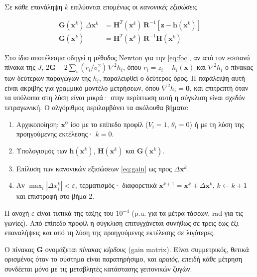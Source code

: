 Σε κάθε επανάληψη $k$ επιλύονται επομένως οι \emph{κανονικές εξισώσεις}

\begin{align}
\mathbf{G}(\mathbf{x}^{k}) \, \Delta \mathbf{x}^{k}
  &= \mathbf{H}^{T}(\mathbf{x}^{k}) \, \mathbf{R}^{-1}
     \left[\mathbf{z} - \mathbf{h}(\mathbf{x}^{k})\right] \\
\mathbf{G}(\mathbf{x}^{k})
  &= \mathbf{H}^{T}(\mathbf{x}^{k}) \, \mathbf{R}^{-1} \mathbf{H}(\mathbf{x}^{k})
\label{eq:gain}
\end{align}

Στο ίδιο αποτέλεσμα οδηγεί η μέθοδος Newton για την \eqref{eq:foc}, αν από τον εσσιανό πίνακα
της $J$, $2\mathbf{G} - 2\sum_{i} (r_i/\sigma_i^2)\,\nabla^{2} h_i$, όπου
$r_i = z_i - h_i(\mathbf{x})$ και $\nabla^{2} h_i$ ο πίνακας των δεύτερων παραγώγων της $h_i$,
παραλειφθεί ο δεύτερος όρος. Η
παράλειψη αυτή είναι ακριβής για γραμμικό μοντέλο μετρήσεων, όπου $\nabla^{2} h_i = \mathbf{0}$,
και επιτρεπτή όταν τα υπόλοιπα στη λύση είναι μικρά· στην περίπτωση αυτή η σύγκλιση είναι
σχεδόν τετραγωνική. Ο αλγόριθμος περιλαμβάνει τα ακόλουθα βήματα:

\begin{enumerate}
\item Αρχικοποίηση: $\mathbf{x}^{0}$ ίσο με το επίπεδο προφίλ ($V_i = 1$, $\theta_i = 0$) ή
      με τη λύση της προηγούμενης εκτέλεσης· $k = 0$.
\item Υπολογισμός των $\mathbf{h}(\mathbf{x}^{k})$, $\mathbf{H}(\mathbf{x}^{k})$ και
      $\mathbf{G}(\mathbf{x}^{k})$.
\item Επίλυση των κανονικών εξισώσεων \eqref{eq:gain} ως προς $\Delta\mathbf{x}^{k}$.
\item Αν $\max_i |\Delta x_i^{k}| < \varepsilon$, τερματισμός· διαφορετικά
      $\mathbf{x}^{k+1} = \mathbf{x}^{k} + \Delta\mathbf{x}^{k}$, $k \leftarrow k + 1$ και
      επιστροφή στο βήμα 2.
\end{enumerate}

Η ανοχή $\varepsilon$ είναι τυπικά της τάξης του $10^{-4}$ (p.u. για τα μέτρα τάσεων, rad για
τις γωνίες). Από επίπεδο προφίλ η σύγκλιση επιτυγχάνεται συνήθως σε τρεις έως έξι επαναλήψεις
και από τη λύση της προηγούμενης εκτέλεσης σε λιγότερες.

Ο πίνακας $\mathbf{G}$ ονομάζεται \emph{πίνακας κέρδους} (gain matrix). Είναι συμμετρικός,
θετικά ορισμένος όταν το σύστημα είναι παρατηρήσιμο, και \emph{αραιός}, επειδή κάθε μέτρηση
συνδέεται μόνο με τις μεταβλητές κατάστασης γειτονικών ζυγών.

